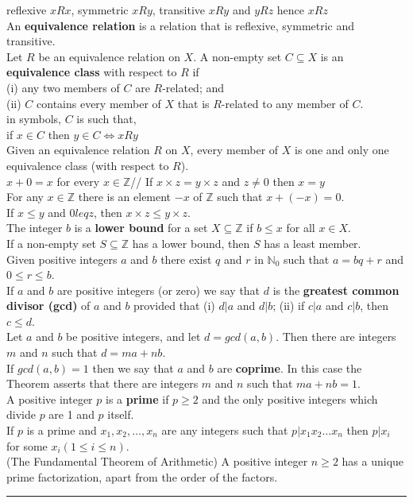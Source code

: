 \documentclass[10pt,landscape]{article}
\begin{document}
\begin{multicols}{3}
reflexive $xRx$, symmetric $xRy$, transitive $xRy$ and $yRz$ hence $xRz$\\
An \textbf{equivalence relation} is a relation that is reflexive, symmetric and transitive.\\
Let $R$ be an equivalence relation on $X$. A non-empty set $C \subseteq X$ is an \textbf{equivalence class} with respect to $R$ if\\
(i) any two members of $C$ are $R$-related; and\\
(ii) $C$ contains every member of $X$ that is $R$-related to any member of $C$.\\
in symbols, $C$ is such that,\\
if $x \in C$ then $y \in C \iff xRy$\\ 
Given an equivalence relation $R$ on $X$, every member of $X$ is one and only one equivalence class (with respect to $R$).\\
$x + 0 = x$ for every $x \in \mathbb{Z}$//
If $x \times z = y \times z$ and $z \neq 0$ then $x = y$\\
For any $x \in \mathbb{Z}$ there is an element $-x$ of $\mathbb{Z}$ such that $x +(-x)=0$.\\
If $x \leq y$ and $0 leq z$, then $x \times z \leq y \times z$.\\
The integer $b$ is a \textbf{lower bound} for a set $X \subseteq \mathbb{Z}$ if $b \leq x$ for all $x \in X$.\\
If a non-empty set $S \subseteq \mathbb{Z}$ has a lower bound, then $S$ has a least member.\\
Given positive integers $a$ and $b$ there exist $q$ and $r$ in $\mathbb{N}_0$ such that $a = bq + r$ and $0 \leq r \leq b$. \\
If $a$ and $b$ are positive integers (or zero) we say that $d$ is the \textbf{greatest common divisor (gcd)} of $a$ and $b$ provided that (i) $d|a$ and $d|b$; (ii) if $c|a$ and $c|b$, then $c \leq d$.\\
Let $a$ and $b$ be positive integers, and let $d = gcd(a,b)$. Then there are integers $m$ and $n$ such that $d = ma + nb$.\\
If $gcd(a,b) = 1$ then we say that $a$ and $b$ are \textbf{coprime}. In this case the Theorem asserts that there are integers $m$ and $n$ such that $ma + nb = 1$.\\
A positive integer $p$ is a \textbf{prime} if $p \geq 2$ and the only positive integers which divide $p$ are 1 and $p$ itself.\\
If $p$ is a prime and $x_1, x_2, \dotsc ,x_n$ are any integers such that $p|x_1 x_2 \dots x_n$ then $p|x_i$ for some $x_i(1 \leq i \leq n)$.\\
(The Fundamental Theorem of Arithmetic) A positive integer $n \geq 2$ has a unique prime factorization, apart from the order of the factors.\\

\rule{0.3\linewidth}{0.25pt}
\scriptsize


\end{multicols}
\end{document}
